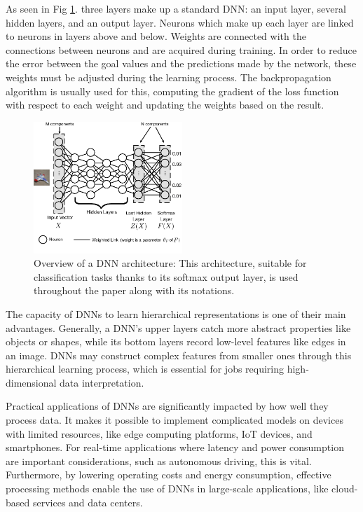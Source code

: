 \documentclass[conference]{IEEEtran}
\begin{document}
As seen in Fig \ref{fig:dnnstructure}. three layers make up a standard DNN: an input layer, several hidden layers, and an output layer.\cite{cichy2019deep} Neurons which make up each layer are linked to neurons in layers above and below. Weights are connected with the connections between neurons and are acquired during training. In order to reduce the error between the goal values and the predictions made by the network, these weights must be adjusted during the learning process. The backpropagation algorithm is usually used for this, computing the gradient of the loss function with respect to each weight and updating the weights based on the result.

\begin{figure}[htbp]
\centerline{\includegraphics[width=0.5\textwidth]{Images/dnnstructure.png}}
\caption{Overview of a DNN architecture: This architecture, suitable for classification tasks thanks to its softmax output layer, is used throughout the paper along with its notations. \cite{article}}
\label{fig:dnnstructure}
\end{figure}

The capacity of DNNs to learn hierarchical representations is one of their main advantages.\cite{samek2021explaining} Generally, a DNN's upper layers catch more abstract properties like objects or shapes, while its bottom layers record low-level features like edges in an image. DNNs may construct complex features from smaller ones through this hierarchical learning process, which is essential for jobs requiring high-dimensional data interpretation. \cite{highperformanceinproceedings}

Practical applications of DNNs are significantly impacted by how well they process data. It makes it possible to implement complicated models on devices with limited resources, like edge computing platforms, IoT devices, and smartphones. For real-time applications where latency and power consumption are important considerations, such as autonomous driving, this is vital.\cite{sze2017efficient} Furthermore, by lowering operating costs and energy consumption, effective processing methods enable the use of DNNs in large-scale applications, like cloud-based services and data centers.\cite{BODDAPATI20172048}
\end{document}
